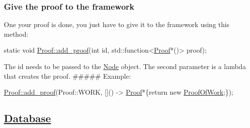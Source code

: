  \subsubsection*{Give the proof to the framework}

One your proof is done, you just have to give it to the framework using this method\+: 
\begin{DoxyCode}
\textcolor{keyword}{static} \textcolor{keywordtype}{void} \mbox{\hyperlink{classProof_a71874539fdbcc93c15594b889c95225b}{Proof::add\_proof}}(\textcolor{keywordtype}{int} \textcolor{keywordtype}{id}, std::function<\mbox{\hyperlink{classProof}{Proof}}*()> proof);
\end{DoxyCode}
 The id needs to be passed to the \mbox{\hyperlink{classNode}{Node}} object. The second parameter is a lambda that creates the proof. \#\#\#\#\# Example\+: 
\begin{DoxyCode}
\mbox{\hyperlink{classProof_a71874539fdbcc93c15594b889c95225b}{Proof::add\_proof}}(Proof::WORK, []() -> \mbox{\hyperlink{classProof}{Proof}}*\{\textcolor{keywordflow}{return} \textcolor{keyword}{new} 
      \mbox{\hyperlink{classProofOfWork}{ProofOfWork}};\});
\end{DoxyCode}
 \subsection*{\mbox{\hyperlink{classDatabase}{Database}}}

